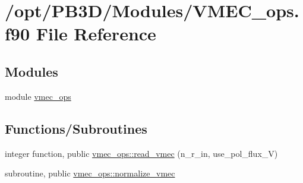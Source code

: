 \hypertarget{VMEC__ops_8f90}{}\section{/opt/\+P\+B3\+D/\+Modules/\+V\+M\+E\+C\+\_\+ops.f90 File Reference}
\label{VMEC__ops_8f90}
\subsection*{Modules}
\begin{DoxyCompactItemize}
\item 
module \hyperlink{namespacevmec__ops}{vmec\+\_\+ops}
\end{DoxyCompactItemize}
\subsection*{Functions/\+Subroutines}
\begin{DoxyCompactItemize}
\item 
integer function, public \hyperlink{namespacevmec__ops_a5afb9dedf9ef3dc2b4d93e20de2e22b8}{vmec\+\_\+ops\+::read\+\_\+vmec} (n\+\_\+r\+\_\+in, use\+\_\+pol\+\_\+flux\+\_\+V)
\item 
subroutine, public \hyperlink{namespacevmec__ops_a95f04a642fd732a538aef30052a12863}{vmec\+\_\+ops\+::normalize\+\_\+vmec}
\end{DoxyCompactItemize}
